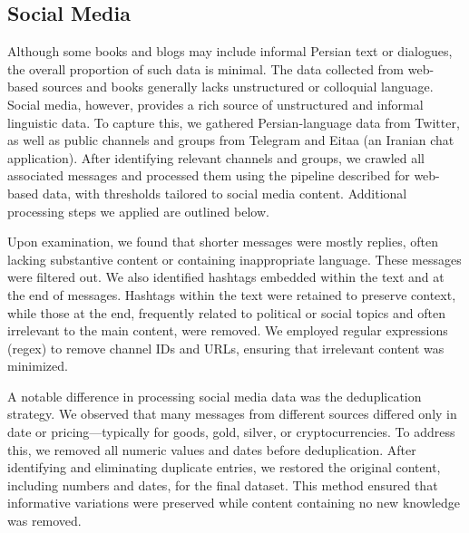 \subsection{Social Media}

Although some books and blogs may include informal Persian text or dialogues, the overall proportion of such data is minimal. The data collected from web-based sources and books generally lacks unstructured or colloquial language. Social media, however, provides a rich source of unstructured and informal linguistic data. To capture this, we gathered Persian-language data from Twitter, as well as public channels and groups from Telegram and Eitaa (an Iranian chat application). After identifying relevant channels and groups, we crawled all associated messages and processed them using the pipeline described for web-based data, with thresholds tailored to social media content. Additional processing steps we applied are outlined below.

Upon examination, we found that shorter messages were mostly replies, often lacking substantive content or containing inappropriate language. These messages were filtered out. We also identified hashtags embedded within the text and at the end of messages. Hashtags within the text were retained to preserve context, while those at the end, frequently related to political or social topics and often irrelevant to the main content, were removed. We employed regular expressions (regex) to remove channel IDs and URLs, ensuring that irrelevant content was minimized.

A notable difference in processing social media data was the deduplication strategy. We observed that many messages from different sources differed only in date or pricing—typically for goods, gold, silver, or cryptocurrencies. To address this, we removed all numeric values and dates before deduplication. After identifying and eliminating duplicate entries, we restored the original content, including numbers and dates, for the final dataset. This method ensured that informative variations were preserved while content containing no new knowledge was removed. 